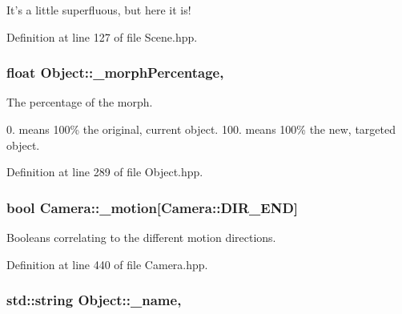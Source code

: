 It's a little superfluous, but here it is! 

Definition at line 127 of file Scene.\-hpp.

\hypertarget{class_object_a7fbbac9027e1a8266342bd5ce064120d}{
\subsubsection[{\-\_\-morph\-Percentage}]{\setlength{\rightskip}{0pt plus 5cm}float Object\-::\-\_\-morph\-Percentage\hspace{0.3cm}{\ttfamily [protected]}, {\ttfamily [inherited]}}}\label{class_object_a7fbbac9027e1a8266342bd5ce064120d}


The percentage of the morph. 

0. means 100\% the original, current object. 100. means 100\% the new, targeted object. 

Definition at line 289 of file Object.\-hpp.

\hypertarget{class_camera_abec7e2becbad5a692a54a69b6a5f6d75}{
\subsubsection[{\-\_\-motion}]{\setlength{\rightskip}{0pt plus 5cm}bool Camera\-::\-\_\-motion\mbox{[}Camera\-::\-D\-I\-R\-\_\-\-E\-N\-D\mbox{]}\hspace{0.3cm}{\ttfamily [private]}}}\label{class_camera_abec7e2becbad5a692a54a69b6a5f6d75}


Booleans correlating to the different motion directions. 



Definition at line 440 of file Camera.\-hpp.

\hypertarget{class_object_a3f617214b260ebbe394e7c7b08ab5e43}{
\subsubsection[{\-\_\-name}]{\setlength{\rightskip}{0pt plus 5cm}std\-::string Object\-::\-\_\-name\hspace{0.3cm}{\ttfamily [protected]}, {\ttfamily [inherited]}}}\label{class_object_a3f617214b260ebbe394e7c7b08ab5e43}


